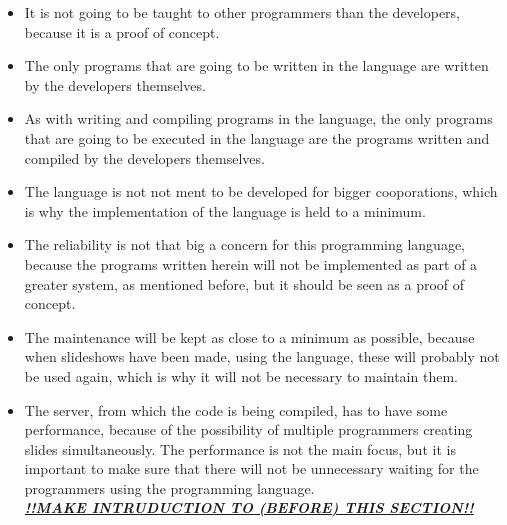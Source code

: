 \begin{itemize}
	\item It is not going to be taught to other programmers than the developers, because it is a proof of concept.
	\item The only programs that are going to be written in the language are written by the developers themselves.
	\item As with writing and compiling programs in the language, the only programs that are going to be executed in the language are the programs written and compiled by the developers themselves.
  \item The language is not not ment to be developed for bigger cooporations, which is why the implementation of the language is held to a minimum.
	\item The reliability is not that big a concern for this programming language, because the programs written herein will not be implemented as part of a greater system, as mentioned before, but it should be seen as a proof of concept.
	\item The maintenance will be kept as close to a minimum as possible, because when slideshows have been made, using the language, these will probably not be used again, which is why it will not be necessary to maintain them.
	\item The server, from which the code is being compiled, has to have some performance, because of the possibility of multiple programmers creating slides simultaneously. The performance is not the main focus, but it is important to make sure that there will not be unnecessary waiting for the programmers using the programming language. \\
\textbf{\textit{\underline{!!MAKE INTRUDUCTION TO (BEFORE) THIS SECTION!!}}}
\end{itemize}


